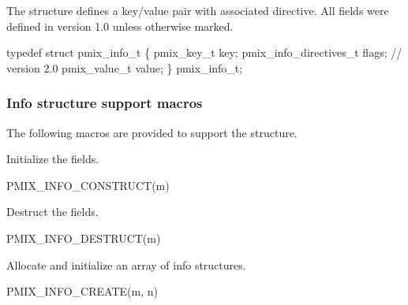 The  structure defines a key/value pair with associated directive. All fields were defined in version 1.0 unless otherwise marked.

\cspecificstart
\begin{codepar}
typedef struct pmix_info_t \{
    pmix_key_t key;
    pmix_info_directives_t flags;    // version 2.0
    pmix_value_t value;
\} pmix_info_t;
\end{codepar}
\cspecificend

\subsubsection{Info structure support macros}
The following macros are provided to support the  structure.


Initialize the  fields.

\cspecificstart
\begin{codepar}
PMIX_INFO_CONSTRUCT(m)
\end{codepar}
\cspecificend

\begin{arglist}
\end{arglist}


Destruct the  fields.

\cspecificstart
\begin{codepar}
PMIX_INFO_DESTRUCT(m)
\end{codepar}
\cspecificend

\begin{arglist}
\end{arglist}


Allocate and initialize an array of info structures.

\cspecificstart
\begin{codepar}
PMIX_INFO_CREATE(m, n)
\end{codepar}
\cspecificend


